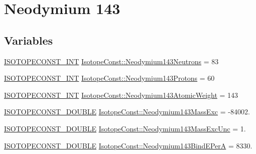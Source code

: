 \hypertarget{group___isotope_const-_neodymium-_nd143}{}\section{Neodymium 143}
\label{group___isotope_const-_neodymium-_nd143}
\subsection*{Variables}
\begin{DoxyCompactItemize}
\item 
\mbox{\hyperlink{group___isotope_const-_macros_ga5f18360b3e99483a35c32d789e62621c}{I\+S\+O\+T\+O\+P\+E\+C\+O\+N\+S\+T\+\_\+\+I\+NT}} \mbox{\hyperlink{group___isotope_const-_neodymium-_nd143_ga3d3126e58f4d50ce2eca798b26a3b59c}{Isotope\+Const\+::\+Neodymium143\+Neutrons}} = 83
\item 
\mbox{\hyperlink{group___isotope_const-_macros_ga5f18360b3e99483a35c32d789e62621c}{I\+S\+O\+T\+O\+P\+E\+C\+O\+N\+S\+T\+\_\+\+I\+NT}} \mbox{\hyperlink{group___isotope_const-_neodymium-_nd143_gaa00c3d609915b47848dd7ce2ddc3e96d}{Isotope\+Const\+::\+Neodymium143\+Protons}} = 60
\item 
\mbox{\hyperlink{group___isotope_const-_macros_ga5f18360b3e99483a35c32d789e62621c}{I\+S\+O\+T\+O\+P\+E\+C\+O\+N\+S\+T\+\_\+\+I\+NT}} \mbox{\hyperlink{group___isotope_const-_neodymium-_nd143_gaf2e11332cb5d589ba3afa2eae5cc2108}{Isotope\+Const\+::\+Neodymium143\+Atomic\+Weight}} = 143
\item 
\mbox{\hyperlink{group___isotope_const-_macros_ga8f45a7272ce02c0b4c65c44636ed719a}{I\+S\+O\+T\+O\+P\+E\+C\+O\+N\+S\+T\+\_\+\+D\+O\+U\+B\+LE}} \mbox{\hyperlink{group___isotope_const-_neodymium-_nd143_ga3291586f0d51bafefdee5dc4e39241bc}{Isotope\+Const\+::\+Neodymium143\+Mass\+Exc}} = -\/84002.
\item 
\mbox{\hyperlink{group___isotope_const-_macros_ga8f45a7272ce02c0b4c65c44636ed719a}{I\+S\+O\+T\+O\+P\+E\+C\+O\+N\+S\+T\+\_\+\+D\+O\+U\+B\+LE}} \mbox{\hyperlink{group___isotope_const-_neodymium-_nd143_ga83bc70bc8ef9b3ce7fbb947c95b3fea9}{Isotope\+Const\+::\+Neodymium143\+Mass\+Exc\+Unc}} = 1.
\item 
\mbox{\hyperlink{group___isotope_const-_macros_ga8f45a7272ce02c0b4c65c44636ed719a}{I\+S\+O\+T\+O\+P\+E\+C\+O\+N\+S\+T\+\_\+\+D\+O\+U\+B\+LE}} \mbox{\hyperlink{group___isotope_const-_neodymium-_nd143_gaf7315b0a39efadb4834912976ef09b1b}{Isotope\+Const\+::\+Neodymium143\+Bind\+E\+PerA}} = 8330.
\item 

\end{DoxyCompactItemize}
